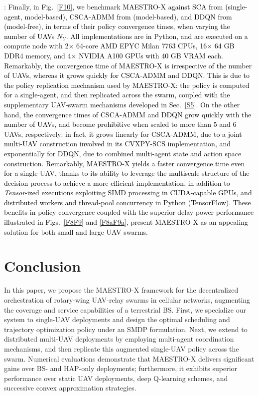 \documentclass[10pt, twocolumn]{IEEEtran}
\theoremstyle{plain}
\theoremstyle{definition}
\theoremstyle{remark}
\newcommand\hlt[1]{\textcolor{black}{#1}}
\begin{document}
{\noindent{\hlt{\underline{Policy convergence time}}}: \hlt{Finally, in Fig.~\ref{F10}, we benchmark MAESTRO-X against SCA from \cite{SCA} (single-agent, model-based), CSCA-ADMM from \cite{CSCA-ADMM} (model-based), and DDQN from \cite{DDQN} (model-free), in terms of their policy convergence times, when varying the number of UAVs $N_{U}$. All implementations are in Python, and are executed on a compute node with 2$\times$ 64-core AMD EPYC Milan 7763 CPUs, 16$\times$ 64 GB DDR4 memory, and 4$\times$ NVIDIA A100 GPUs with 40 GB VRAM each. Remarkably, the convergence time of MAESTRO-X is irrespective of the number of UAVs, whereas it grows quickly for CSCA-ADMM and DDQN. This is due to the policy replication mechanism used by MAESTRO-X: the policy is computed for a single-agent, and then replicated across the swarm, coupled with the supplementary UAV-swarm mechanisms developed in Sec.~\ref{S5}. On the other hand, the convergence times of CSCA-ADMM and DDQN grow quickly with the number of UAVs, and become prohibitive when scaled to more than 5 and 6 UAVs, respectively: in fact, it grows linearly for CSCA-ADMM, due to a joint multi-UAV construction involved in its CVXPY-SCS implementation, and exponentially for DDQN, due to combined multi-agent state and action space construction. Remarkably, MAESTRO-X yields a faster convergence time even for a single UAV, thanks to its ability to leverage the multiscale structure of the decision process to achieve a more efficient implementation, in addition to \emph{Tensor}-ized executions exploiting SIMD processing in CUDA-capable GPUs, and distributed workers and thread-pool concurrency in Python (TensorFlow). These benefits in policy convergence coupled with the superior delay-power performance illustrated in Figs.~\ref{F8F9} and \ref{F8aF9a}, present MAESTRO-X as an appealing solution for both small and large UAV swarms.}
\vspace{-4mm}

\section{Conclusion}\label{S7}
In this paper, we propose the MAESTRO-X framework for the decentralized orchestration of rotary-wing UAV-relay swarms in cellular networks, augmenting the coverage and service capabilities of a terrestrial BS. First, we specialize our system to single-UAV deployments and design the optimal scheduling and trajectory optimization policy under an SMDP formulation. Next, we extend to distributed multi-UAV deployments by employing multi-agent coordination mechanisms, and then replicate this augmented single-UAV policy across the swarm. Numerical evaluations demonstrate that MAESTRO-X delivers significant gains over BS- and HAP-only deployments; furthermore, it exhibits superior performance over static UAV deployments, deep Q-learning schemes, and successive convex approximation strategies.
\vspace{-4mm}

}
\end{document}
